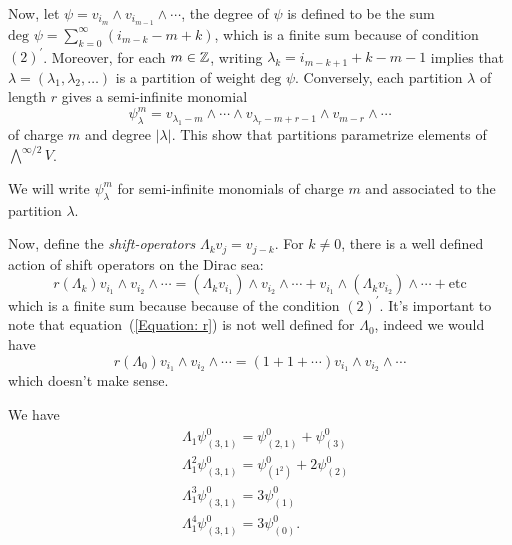 Now, let $\psi=v_{i_m}\wedge v_{i_{m-1}}\wedge\cdots$, the degree of $\psi$ is defined to be the sum $\text{deg }\psi=\sum_{k=0}^\infty (i_{m-k}-m+k)$, which is a finite sum because of condition $(2)^\prime$. Moreover, for each $m\in\mathbb{Z}$, writing $\lambda_{k} = i_{m-k+1}+k-m-1$ implies that $\lambda = (\lambda_1,\lambda_2,\dots)$ is a partition of weight $\text{deg }\psi$. Conversely, each partition $\lambda$ of length $r$ gives a semi-infinite monomial
\begin{equation}
    \psi_\lambda^m=v_{\lambda_1-m}\wedge\cdots\wedge v_{\lambda_r-m+r-1}\wedge v_{m-r}\wedge\cdots
\end{equation}
of charge $m$ and degree $|\lambda|$. This show that partitions parametrize elements of $\bigwedge^{\infty/2}V$.
\begin{dang}
    \begin{notation}
        We will write $\psi_\lambda^m$ for semi-infinite monomials of charge $m$ and associated to the partition $\lambda$.
    \end{notation}
\end{dang}
Now, define the \textit{shift-operators} $\Lambda_kv_{j}=v_{j-k}$. For $k\neq0$, there is a well defined action of shift operators on the Dirac sea:
\begin{equation}\label{Equation: r}
     r(\Lambda_k) v_{i_1}\wedge v_{i_2}\wedge\cdots = (\Lambda_kv_{i_1})\wedge v_{i_2}\wedge\cdots + v_{i_1}\wedge(\Lambda_kv_{i_2})\wedge\cdots+\text{etc}
\end{equation}
which is a finite sum because because of the condition $(2)^\prime$. It's important to note that equation~(\ref{Equation: r}) is not well defined for $\Lambda_0$, indeed we would have
\begin{equation}
    r(\Lambda_0)v_{i_1}\wedge v_{i_2}\wedge\cdots= (1+1+\cdots)v_{i_1}\wedge v_{i_2}\wedge\cdots
\end{equation}
which doesn't make sense.
\begin{dang}
    \begin{example}
        We have
        \begin{equation}
            \begin{split}
                &\Lambda_1\psi_{(3,1)}^0=\psi_{(2,1)}^0+\psi_{(3)}^0\\
                &\Lambda_1^2\psi_{(3,1)}^0=\psi_{(1^2)}^0+2\psi_{(2)}^0\\
                &\Lambda_1^3\psi_{(3,1)}^0=3\psi_{(1)}^0\\
                &\Lambda_1^4\psi_{(3,1)}^0=3\psi_{(0)}^0.
            \end{split}
        \end{equation}
    \end{example}
\end{dang}
